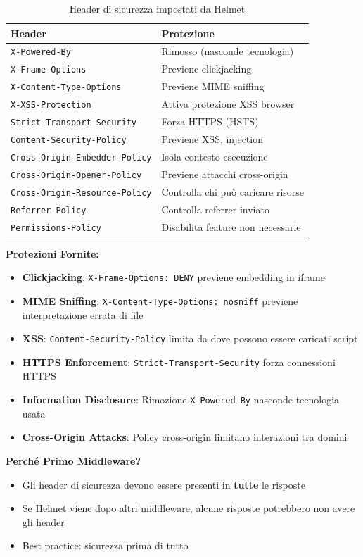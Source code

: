 \documentclass[11pt,a4paper]{article}
\newcommand{\code}[1]{\texttt{#1}}
\newcommand{\important}[1]{\textcolor{red!80!black}{\textbf{#1}}}
\begin{document}
\begin{table}[H]
\centering
\begin{tabular}{@{}ll@{}}
\toprule
\textbf{Header} & \textbf{Protezione} \\
\midrule
\texttt{X-Powered-By} & Rimosso (nasconde tecnologia) \\
\texttt{X-Frame-Options} & Previene clickjacking \\
\texttt{X-Content-Type-Options} & Previene MIME sniffing \\
\texttt{X-XSS-Protection} & Attiva protezione XSS browser \\
\texttt{Strict-Transport-Security} & Forza HTTPS (HSTS) \\
\texttt{Content-Security-Policy} & Previene XSS, injection \\
\texttt{Cross-Origin-Embedder-Policy} & Isola contesto esecuzione \\
\texttt{Cross-Origin-Opener-Policy} & Previene attacchi cross-origin \\
\texttt{Cross-Origin-Resource-Policy} & Controlla chi può caricare risorse \\
\texttt{Referrer-Policy} & Controlla referrer inviato \\
\texttt{Permissions-Policy} & Disabilita feature non necessarie \\
\bottomrule
\end{tabular}
\caption{Header di sicurezza impostati da Helmet}
\end{table}

\textbf{Protezioni Fornite:}
\begin{itemize}
    \item \textbf{Clickjacking}: \code{X-Frame-Options: DENY} previene embedding in iframe
    \item \textbf{MIME Sniffing}: \code{X-Content-Type-Options: nosniff} previene interpretazione errata di file
    \item \textbf{XSS}: \code{Content-Security-Policy} limita da dove possono essere caricati script
    \item \textbf{HTTPS Enforcement}: \code{Strict-Transport-Security} forza connessioni HTTPS
    \item \textbf{Information Disclosure}: Rimozione \code{X-Powered-By} nasconde tecnologia usata
    \item \textbf{Cross-Origin Attacks}: Policy cross-origin limitano interazioni tra domini
\end{itemize}

\textbf{Perché Primo Middleware?}
\begin{itemize}
    \item Gli header di sicurezza devono essere presenti in \important{tutte} le risposte
    \item Se Helmet viene dopo altri middleware, alcune risposte potrebbero non avere gli header
    \item Best practice: sicurezza prima di tutto
\end{itemize}
\end{document}
